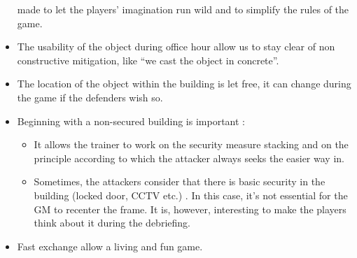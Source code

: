 \documentclass[11pt]{article} %
\begin{document}
\begin{itemize}
made to let the players' imagination run wild and to simplify the rules of the game.
\item The usability of the object during office hour allow us to stay clear 
of non constructive mitigation, like ``we cast the object in concrete''.
\item The location of the object within the building is let free, 
it can change during the game if the defenders wish so.
\item Beginning with a non-secured building is important :
	\begin{itemize}	
	\item It allows the trainer to work on the security measure stacking and on the principle according 
	to which the attacker always seeks the easier way in. 
	\item Sometimes, the attackers consider that there is basic security in the building (locked door,
	 CCTV etc.) . In this case, it's not essential for the GM to recenter the frame. It is, however,
	  interesting to make the players think about it during the debriefing. 
	\end{itemize}
\item Fast exchange allow a living and fun game.
\end{itemize}

\end{document}
